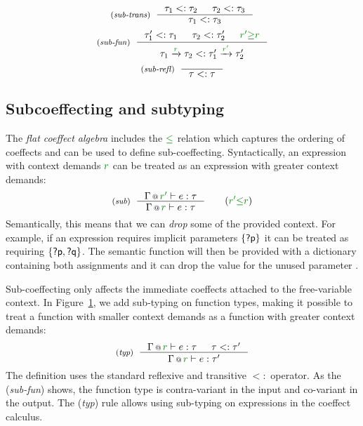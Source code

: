 \begin{figure}[t]
\begin{equation*}
\tyrule{sub-trans}
  { \tau_1 <: \tau_2 & \tau_2 <: \tau_3 }
  { \tau_1 <: \tau_3  }
\end{equation*}
\begin{equation*}
\tyrule{sub-fun}
  { \tau_1' <: \tau_1 & \tau_2 <: \tau_2' & \cclrd{r'} \cgeq \cclrd{r} }
  { \tau_1 \xrightarrow{\cclrd{r}} \tau_2 <: \tau_1' \xrightarrow{\cclrd{r'}} \tau_2' }
\end{equation*}
\begin{equation*}
\tyrule{sub-refl}
  { }
  { \tau <: \tau }
\end{equation*}

\label{fig:flat-types-sub}
\end{figure}


\subsection{Subcoeffecting and subtyping}
\label{sec:flat-exts-sub}

The \emph{flat coeffect algebra} includes the $\cleq$ relation which captures the ordering of
coeffects and can be used to define sub-coeffecting. Syntactically, an expression with context
demands $\cclrd{r}$ can be treated as an expression with greater context demands:
%
\begin{equation*}
\tyrule{sub}
  {\coctx{\Gamma}{\cclrd{r'}} \vdash e : \tau }
  {\coctx{\Gamma}{\cclrd{r}} \vdash e : \tau }\quad\quad(\cclrd{r'} \cleq \cclrd{r})
\end{equation*}
%
Semantically, this means that we can \emph{drop} some of the provided context. For example,
if an expression requires implicit parameters $\{ \textnormal{\sffamily ?p} \}$ it can be treated as requiring
$\{ \textnormal{\sffamily ?p}, \textnormal{\sffamily ?q} \}$. The semantic function will then be provided with a dictionary
containing both assignments and it can drop the value for the unused parameter .

Sub-coeffecting only affects the immediate coeffects attached to the free-variable context.
In Figure~\ref{fig:flat-types-sub}, we add sub-typing on function types, making it possible to treat
a function with smaller context demands as a function with greater context demands:
%
\begin{equation*}
\tyrule{typ}
  { \coctx{\Gamma}{\cclrd{r}} \vdash e : \tau & \tau <: \tau' }
  { \coctx{\Gamma}{\cclrd{r}} \vdash e : \tau' }
\end{equation*}
%
The definition uses the standard reflexive and transitive $<:$ operator. As the (\emph{sub-fun})
shows, the function type is contra-variant in the input and co-variant in the output. The
(\emph{typ}) rule allows using sub-typing on expressions in the coeffect calculus.


